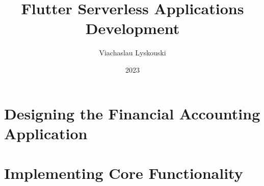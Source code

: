 \documentclass[12pt, a4paper, twoside]{extreport}
\author{Viachaslau Lyskouski}
\title{Flutter Serverless Applications Development}
\date{2023}
\begin{document}


\maketitle

%

\tableofcontents



%




\section{Designing the Financial Accounting Application}


\section{Implementing Core Functionality}



\thispagestyle{empty}



~
\end{document}
